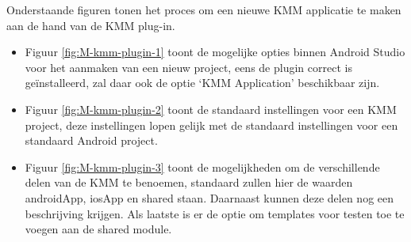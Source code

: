     Onderstaande figuren tonen het proces om een nieuwe KMM applicatie te maken aan de hand van de KMM plug-in. 
    \begin{itemize}
        \item Figuur \ref{fig:M-kmm-plugin-1} toont de mogelijke opties binnen Android Studio voor het aanmaken van een nieuw project, eens de plugin correct is geïnstalleerd, zal daar ook de optie  `KMM Application’ beschikbaar zijn.
        \item Figuur \ref{fig:M-kmm-plugin-2} toont de standaard instellingen voor een KMM project, deze instellingen lopen gelijk met de standaard instellingen voor een standaard Android project.
        \item Figuur \ref{fig:M-kmm-plugin-3} toont de mogelijkheden om de verschillende delen van de KMM te benoemen, standaard zullen hier de waarden androidApp, iosApp en shared staan. Daarnaast kunnen deze delen nog een beschrijving krijgen. Als laatste is er de optie om templates voor testen toe te voegen aan de shared module.
    \end{itemize}
 
